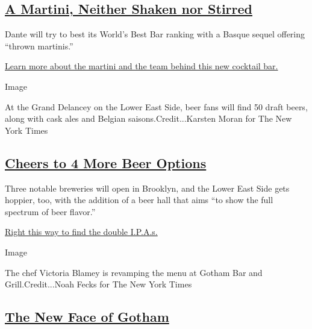 \hypertarget{a-martini-neither-shaken-nor-stirred}{%
\subsection{\texorpdfstring{\href{https://www.nytimes3xbfgragh.onion/2019/09/03/dining/drinks/dante-west-village.html}{A
Martini, Neither Shaken nor
Stirred}}{A Martini, Neither Shaken nor Stirred}}\label{a-martini-neither-shaken-nor-stirred}}

Dante will try to best its World's Best Bar ranking with a Basque sequel
offering ``thrown martinis.''

\href{https://www.nytimes3xbfgragh.onion/2019/09/03/dining/drinks/dante-west-village.html}{Learn
more about the martini and the team behind this new cocktail bar.}

Image

At the Grand Delancey on the Lower East Side, beer fans will find 50
draft beers, along with cask ales and Belgian saisons.Credit...Karsten
Moran for The New York Times

\hypertarget{cheers-to-4-more-beer-options}{%
\subsection{\texorpdfstring{\href{https://www.nytimes3xbfgragh.onion/2019/09/03/dining/drinks/beer-bars-breweries-new-york-city.html}{Cheers
to 4 More Beer
Options}}{Cheers to 4 More Beer Options}}\label{cheers-to-4-more-beer-options}}

Three notable breweries will open in Brooklyn, and the Lower East Side
gets hoppier, too, with the addition of a beer hall that aims ``to show
the full spectrum of beer flavor.''

\href{https://www.nytimes3xbfgragh.onion/2019/09/03/dining/drinks/beer-bars-breweries-new-york-city.html}{Right
this way to find the double I.P.A.s.}

Image

The chef Victoria Blamey is revamping the menu at Gotham Bar and
Grill.Credit...Noah Fecks for The New York Times

\hypertarget{the-new-face-of-gotham}{%
\subsection{\texorpdfstring{\href{https://www.nytimes3xbfgragh.onion/2019/09/03/dining/gotham-bar-and-grill-victoria-blamey.html}{The
New Face of
Gotham}}{The New Face of Gotham}}\label{the-new-face-of-gotham}}

